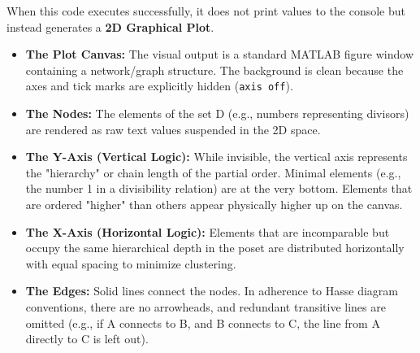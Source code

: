 When this code executes successfully, it does not print values to the console but instead generates a \textbf{2D Graphical Plot}.

\begin{itemize}
\item \textbf{The Plot Canvas:} The visual output is a standard MATLAB figure window containing a network/graph structure. The background is clean because the axes and tick marks are explicitly hidden (\texttt{axis off}).
\item \textbf{The Nodes:} The elements of the set D (e.g., numbers representing divisors) are rendered as raw text values suspended in the 2D space.
\item \textbf{The Y-Axis (Vertical Logic):} While invisible, the vertical axis represents the "hierarchy" or chain length of the partial order. Minimal elements (e.g., the number 1 in a divisibility relation) are at the very bottom. Elements that are ordered "higher" than others appear physically higher up on the canvas.
\item \textbf{The X-Axis (Horizontal Logic):} Elements that are incomparable but occupy the same hierarchical depth in the poset are distributed horizontally with equal spacing to minimize clustering.
\item \textbf{The Edges:} Solid lines connect the nodes. In adherence to Hasse diagram conventions, there are no arrowheads, and redundant transitive lines are omitted (e.g., if A connects to B, and B connects to C, the line from A directly to C is left out).
\end{itemize}

